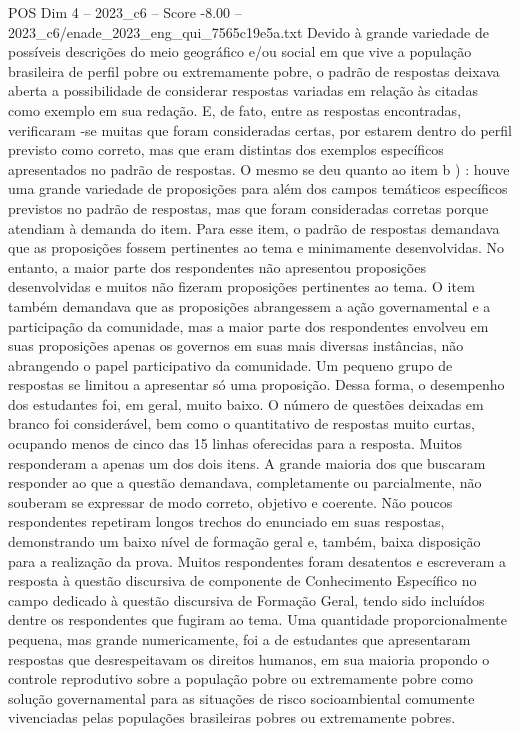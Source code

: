 \begin{textsample}{POS Dim 4 – 2023\_c6 – Score -8.00 – 2023\_c6/enade\_2023\_eng\_qui\_7565c19e5a.txt}
Devido à grande variedade de possíveis descrições do meio geográfico e/ou social em que vive a população brasileira de perfil pobre ou extremamente pobre, o padrão de respostas deixava aberta a possibilidade de considerar respostas variadas em relação às citadas como exemplo em sua redação.
E, de fato, entre as respostas encontradas, verificaram -se muitas que foram consideradas certas, por estarem dentro do perfil previsto como correto, mas que eram distintas dos exemplos específicos apresentados no padrão de respostas.
O mesmo se deu quanto ao item b ) : houve uma grande variedade de proposições para além dos campos temáticos específicos previstos no padrão de respostas, mas que foram consideradas corretas porque atendiam à demanda do item.
Para esse item, o padrão de respostas demandava que as proposições fossem pertinentes ao tema e minimamente desenvolvidas.
No entanto, a maior parte dos respondentes não apresentou proposições desenvolvidas e muitos não fizeram proposições pertinentes ao tema.
O item também demandava que as proposições abrangessem a ação governamental e a participação da comunidade, mas a maior parte dos respondentes envolveu em suas proposições apenas os governos em suas mais diversas instâncias, não abrangendo o papel participativo da comunidade.
Um pequeno grupo de respostas se limitou a apresentar só uma proposição.
Dessa forma, o desempenho dos estudantes foi, em geral, muito baixo.
O número de questões deixadas em branco foi considerável, bem como o quantitativo de respostas muito curtas, ocupando menos de cinco das 15 linhas oferecidas para a resposta.
Muitos responderam a apenas um dos dois itens.
A grande maioria dos que buscaram responder ao que a questão demandava, completamente ou parcialmente, não souberam se expressar de modo correto, objetivo e coerente.
Não poucos respondentes repetiram longos trechos do enunciado em suas respostas, demonstrando um baixo nível de formação geral e, também, baixa disposição para a realização da prova.
Muitos respondentes foram desatentos e escreveram a resposta à questão discursiva de componente de Conhecimento Específico no campo dedicado à questão discursiva de Formação Geral, tendo sido incluídos dentre os respondentes que fugiram ao tema.
Uma quantidade proporcionalmente pequena, mas grande numericamente, foi a de estudantes que apresentaram respostas que desrespeitavam os direitos humanos, em sua maioria propondo o controle reprodutivo sobre a população pobre ou extremamente pobre como solução governamental para as situações de risco socioambiental comumente vivenciadas pelas populações brasileiras pobres ou extremamente pobres.

\end{textsample}
